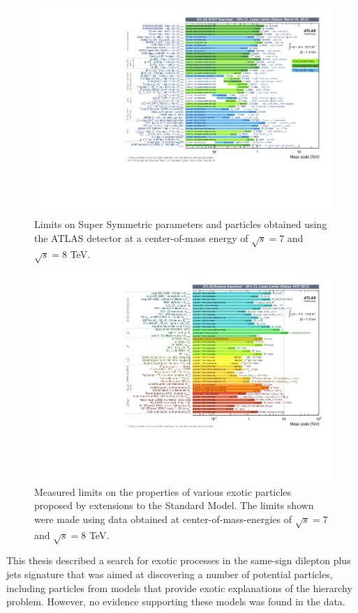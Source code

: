 \begin{figure}[ht!]
  \begin{center}
    \includegraphics[width=.75\textwidth]{figures/conclusion/Susy}
    \caption{Limits on Super Symmetric parameters and particles obtained using the ATLAS detector at a center-of-mass energy of $\sqrt{s}=7$ and $\sqrt{s} = 8$ TeV.}
    \label{fig:susy}
  \end{center}
\end{figure}


\begin{figure}[ht!]
  \begin{center}
    \includegraphics[width=.75\textwidth]{figures/conclusion/ExoticResultsSummary}
    \caption{Measured limits on the properties of various exotic particles proposed by extensions to the Standard Model. The limits shown were made using data obtained at center-of-mass-energies of $\sqrt{s}=7$ and $\sqrt{s} = 8$ TeV.}
    \label{fig:xsec_vs_roots}
  \end{center}
\end{figure}

This thesis described a search for exotic processes in the same-sign dilepton plus jets signature that
was aimed at discovering a number of potential particles, including particles from models that provide
exotic explanations of the hierarchy problem.
However, no evidence supporting these models was found in the data.

